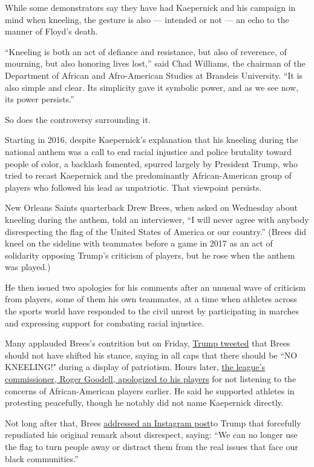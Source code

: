 While some demonstrators say they have had Kaepernick and his campaign
in mind when kneeling, the gesture is also --- intended or not --- an
echo to the manner of Floyd's death.

``Kneeling is both an act of defiance and resistance, but also of
reverence, of mourning, but also honoring lives lost,'' said Chad
Williams, the chairman of the Department of African and Afro-American
Studies at Brandeis University. ``It is also simple and clear. Its
simplicity gave it symbolic power, and as we see now, its power
persists.''

So does the controversy surrounding it.

Starting in 2016, despite Kaepernick's explanation that his kneeling
during the national anthem was a call to end racial injustice and police
brutality toward people of color, a backlash fomented, spurred largely
by President Trump, who tried to recast Kaepernick and the predominantly
African-American group of players who followed his lead as unpatriotic.
That viewpoint persists.

New Orleans Saints quarterback Drew Brees, when asked on Wednesday about
kneeling during the anthem, told an interviewer, ``I will never agree
with anybody disrespecting the flag of the United States of America or
our country.'' (Brees did kneel on the sideline with teammates before a
game in 2017 as an act of solidarity opposing Trump's criticism of
players, but he rose when the anthem was played.)

He then issued two apologies for his comments after an unusual wave of
criticism from players, some of them his own teammates, at a time when
athletes across the sports world have responded to the civil unrest by
participating in marches and expressing support for combating racial
injustice.

Many applauded Brees's contrition but on Friday,
\href{https://twitter.com/realDonaldTrump/status/1268998143733051394?s=20}{Trump
tweeted} that Brees should not have shifted his stance, saying in all
caps that there should be ``NO KNEELING!" during a display of
patriotism. Hours later,
\href{https://twitter.com/NFL/status/1269034074552721408}{the league's
commissioner, Roger Goodell, apologized to his players} for not
listening to the concerns of African-American players earlier. He said
he supported athletes in protesting peacefully, though he notably did
not name Kaepernick directly.

Not long after that, Brees
\href{https://www.instagram.com/p/CBE4y_9Hj2S/?igshid=7ejunv7ktpcn}{addressed
an Instagram post}to Trump that forcefully repudiated his original
remark about disrespect, saying: ``We can no longer use the flag to turn
people away or distract them from the real issues that face our black
communities.''

